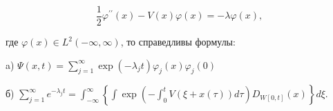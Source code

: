 \documentclass[10pt]{article}
\begin{document}
\[

\frac{1}{2} \varphi^{\prime \prime}(x)-V(x) \varphi(x)=-\lambda \varphi(x),

\]



где $\varphi(x) \in L^{2}(-\infty, \infty)$, то справедливы формулы:



a) $\Psi(x, t)=\sum_{j=1}^{\infty} \exp \left(-\lambda_{j} t\right) \varphi_{j}(x) \varphi_{j}(0)$



б) $\sum_{j=1}^{\infty} e^{-\lambda_{j} t}=\int_{-\infty}^{\infty}\left\{\int \exp \left(-\int_{0}^{t} V(\xi+x(\tau)) d \tau\right) D_{W[0, t]}(x)\right\} d \xi$.
\end{document}
